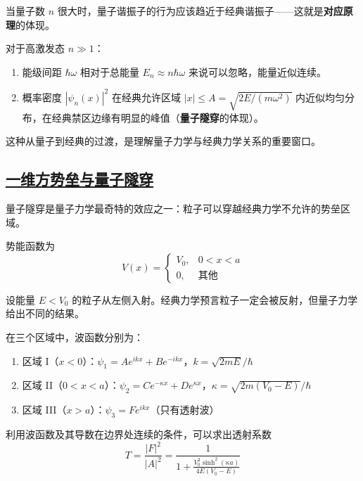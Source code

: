 当量子数 $n$ 很大时，量子谐振子的行为应该趋近于经典谐振子——这就是\textbf{对应原理}的体现。

对于高激发态 $n \gg 1$：
\begin{enumerate}
    \item 能级间距 $\hbar\omega$ 相对于总能量 $E_n \approx n\hbar\omega$ 来说可以忽略，能量近似连续。
    \item 概率密度 $|\psi_n(x)|^2$ 在经典允许区域 $|x| \leq A = \sqrt{2E/(m\omega^2)}$ 内近似均匀分布，在经典禁区边缘有明显的峰值（\textbf{量子隧穿}的体现）。
\end{enumerate}

这种从量子到经典的过渡，是理解量子力学与经典力学关系的重要窗口。

\subsection{\protect\hyperlink{:}{一维方势垒与量子隧穿}}

量子隧穿是量子力学最奇特的效应之一：粒子可以穿越经典力学不允许的势垒区域。

\begin{definition}[一维方势垒]
    势能函数为
    \begin{equation}
        V(x) = \begin{cases} V_0, & 0 < x < a \\ 0, & \text{其他} \end{cases}
    \end{equation}
\end{definition}

设能量 $E < V_0$ 的粒子从左侧入射。经典力学预言粒子一定会被反射，但量子力学给出不同的结果。

在三个区域中，波函数分别为：
\begin{enumerate}
    \item 区域 I（$x < 0$）：$\psi_1 = Ae^{ikx} + Be^{-ikx}$，$k = \sqrt{2mE}/\hbar$
    \item 区域 II（$0 < x < a$）：$\psi_2 = Ce^{-\kappa x} + De^{\kappa x}$，$\kappa = \sqrt{2m(V_0-E)}/\hbar$
    \item 区域 III（$x > a$）：$\psi_3 = Fe^{ikx}$（只有透射波）
\end{enumerate}

利用波函数及其导数在边界处连续的条件，可以求出透射系数
\begin{equation}
    T = \frac{|F|^2}{|A|^2} = \frac{1}{1 + \frac{V_0^2\sinh^2(\kappa a)}{4E(V_0-E)}}
\end{equation}

